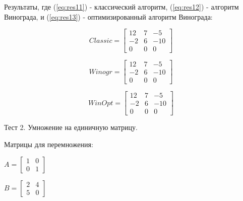 \documentclass[12pt,a4paper]{scrartcl}
\begin{document}
Результаты, где (\ref{eq:res11}) - классический алгоритм, (\ref{eq:res12}) - алгоритм Винограда, и (\ref{eq:res13}) - оптимизированный алгоритм Винограда:

\begin{center}
	\begin{minipage}[c][3cm][c]{0,3\textwidth}
		\begin{equation}\label{eq:res11}
		Classic =\begin{bmatrix}
		12 & 7 & -5\\
		-2 & 6 & -10\\
		0 & 0 & 0
		\end{bmatrix}
		\end{equation}
	\end{minipage}
	\begin{minipage}[c][3cm][c]{0,3\textwidth}
		\begin{equation}\label{eq:res12}
		Winogr =\begin{bmatrix}
		12 & 7 & -5\\
		-2 & 6 & -10\\
		0 & 0 & 0
		\end{bmatrix}
		\end{equation}
	\end{minipage}
	\begin{minipage}[c][3cm][c]{0,3\textwidth}
		\begin{equation}\label{eq:res13}
		WinOpt =\begin{bmatrix}
		12 & 7 & -5\\
		-2 & 6 & -10\\
		0 & 0 & 0
		\end{bmatrix}
		\end{equation}
	\end{minipage}
\end{center}

Тест 2. Умножение на единичную матрицу.

Матрицы для перемножения:

\begin{minipage}[c][3cm][c]{0,5\textwidth}
	\begin{math}\label{eq:test21}
	A =\begin{bmatrix}
	1 & 0 \\
	0 & 1
	\end{bmatrix}
	\end{math}
\end{minipage}
\begin{minipage}[c][3cm][c]{0,5\textwidth}
	\begin{math}\label{eq:test22}
	B =\begin{bmatrix}
	2 & 4 \\
	5 & 0 
	\end{bmatrix}
	\end{math}
\end{minipage}
\end{document}
